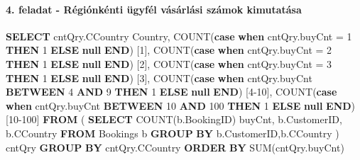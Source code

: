\documentclass[
]{article}
\newenvironment{Shaded}{\begin{snugshade}}{\end{snugshade}}
\newcommand{\ControlFlowTok}[1]{\textcolor[rgb]{0.00,0.44,0.13}{\textbf{#1}}}
\newcommand{\DecValTok}[1]{\textcolor[rgb]{0.25,0.63,0.44}{#1}}
\newcommand{\FunctionTok}[1]{\textcolor[rgb]{0.02,0.16,0.49}{#1}}
\newcommand{\KeywordTok}[1]{\textcolor[rgb]{0.00,0.44,0.13}{\textbf{#1}}}
\newcommand{\NormalTok}[1]{#1}
\newcommand{\OperatorTok}[1]{\textcolor[rgb]{0.40,0.40,0.40}{#1}}
\begin{document}
\hypertarget{feladat---ruxe9giuxf3nkuxe9nti-uxfcgyfuxe9l-vuxe1suxe1rluxe1si-szuxe1mok-kimutatuxe1sa}{%
\paragraph{4. feladat - Régiónkénti ügyfél vásárlási számok
kimutatása}\label{feladat---ruxe9giuxf3nkuxe9nti-uxfcgyfuxe9l-vuxe1suxe1rluxe1si-szuxe1mok-kimutatuxe1sa}}

\begin{Shaded}
\begin{Highlighting}[]
\KeywordTok{SELECT}\NormalTok{ cntQry.CCountry Country, }
    \FunctionTok{COUNT}\NormalTok{(}\ControlFlowTok{case} \ControlFlowTok{when}\NormalTok{ cntQry.buyCnt }\OperatorTok{=} \DecValTok{1} \ControlFlowTok{THEN} \DecValTok{1} \ControlFlowTok{ELSE} \KeywordTok{null} \ControlFlowTok{END}\NormalTok{) [}\DecValTok{1}\NormalTok{], }
    \FunctionTok{COUNT}\NormalTok{(}\ControlFlowTok{case} \ControlFlowTok{when}\NormalTok{ cntQry.buyCnt }\OperatorTok{=} \DecValTok{2} \ControlFlowTok{THEN} \DecValTok{1} \ControlFlowTok{ELSE} \KeywordTok{null} \ControlFlowTok{END}\NormalTok{) [}\DecValTok{2}\NormalTok{], }
    \FunctionTok{COUNT}\NormalTok{(}\ControlFlowTok{case} \ControlFlowTok{when}\NormalTok{ cntQry.buyCnt }\OperatorTok{=} \DecValTok{3} \ControlFlowTok{THEN} \DecValTok{1} \ControlFlowTok{ELSE} \KeywordTok{null} \ControlFlowTok{END}\NormalTok{) [}\DecValTok{3}\NormalTok{], }
    \FunctionTok{COUNT}\NormalTok{(}\ControlFlowTok{case} \ControlFlowTok{when}\NormalTok{ cntQry.buyCnt }\KeywordTok{BETWEEN} \DecValTok{4} \KeywordTok{AND} \DecValTok{9} \ControlFlowTok{THEN} \DecValTok{1} \ControlFlowTok{ELSE} \KeywordTok{null} \ControlFlowTok{END}\NormalTok{) [}\DecValTok{4}\OperatorTok{-}\DecValTok{10}\NormalTok{], }
    \FunctionTok{COUNT}\NormalTok{(}\ControlFlowTok{case} \ControlFlowTok{when}\NormalTok{ cntQry.buyCnt }\KeywordTok{BETWEEN} \DecValTok{10} \KeywordTok{AND} \DecValTok{100} \ControlFlowTok{THEN} \DecValTok{1} \ControlFlowTok{ELSE} \KeywordTok{null} \ControlFlowTok{END}\NormalTok{) [}\DecValTok{10}\OperatorTok{-}\DecValTok{100}\NormalTok{]}
\KeywordTok{FROM}\NormalTok{ (}
    \KeywordTok{SELECT} \FunctionTok{COUNT}\NormalTok{(b.BookingID) buyCnt, b.CustomerID, b.CCountry }
    \KeywordTok{FROM}\NormalTok{ Bookings b }
    \KeywordTok{GROUP} \KeywordTok{BY}\NormalTok{ b.CustomerID,b.CCountry}
\NormalTok{    ) cntQry}
\KeywordTok{GROUP} \KeywordTok{BY}\NormalTok{ cntQry.CCountry}
\KeywordTok{ORDER} \KeywordTok{BY} \FunctionTok{SUM}\NormalTok{(cntQry.buyCnt)}
\end{Highlighting}
\end{Shaded}
\end{document}
